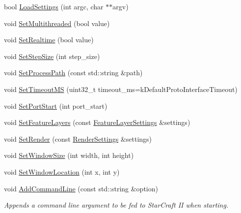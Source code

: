 \begin{DoxyCompactItemize}
\item 
bool \hyperlink{classsc2_1_1_coordinator_ada059b9a60d901be047ef33ce612c5d2}{Load\+Settings} (int argc, char $\ast$$\ast$argv)
\item 
void \hyperlink{classsc2_1_1_coordinator_a555587bc85ac437711d15b569c75181a}{Set\+Multithreaded} (bool value)
\item 
void \hyperlink{classsc2_1_1_coordinator_a602e6ead93e360771ce36d6ac782fc2a}{Set\+Realtime} (bool value)
\item 
void \hyperlink{classsc2_1_1_coordinator_a7cea718f571effbe25b771315628c685}{Set\+Step\+Size} (int step\+\_\+size)
\item 
void \hyperlink{classsc2_1_1_coordinator_ad906656238e13a8bab21c46f50aecc3d}{Set\+Process\+Path} (const std\+::string \&path)
\item 
void \hyperlink{classsc2_1_1_coordinator_aadbfd927d66314a4eb949b2de2ae37b4}{Set\+Timeout\+MS} (uint32\+\_\+t timeout\+\_\+ms=k\+Default\+Proto\+Interface\+Timeout)
\item 
void \hyperlink{classsc2_1_1_coordinator_aaad48921bac2f4f84471de5e9cff75d5}{Set\+Port\+Start} (int port\+\_\+start)
\item 
void \hyperlink{classsc2_1_1_coordinator_ab46aec5712f6ec8ef12b03854f6e0495}{Set\+Feature\+Layers} (const \hyperlink{structsc2_1_1_feature_layer_settings}{Feature\+Layer\+Settings} \&settings)
\item 
void \hyperlink{classsc2_1_1_coordinator_ace8a0630c6b61d28e81c94bbebad3d7d}{Set\+Render} (const \hyperlink{structsc2_1_1_render_settings}{Render\+Settings} \&settings)
\item 
void \hyperlink{classsc2_1_1_coordinator_a9b0eca71a6f7575f35d1dd5c3e5d73cf}{Set\+Window\+Size} (int width, int height)
\item 
void \hyperlink{classsc2_1_1_coordinator_a6e372788e11c3916fdf1982eb2e55511}{Set\+Window\+Location} (int x, int y)
\item 
\mbox{\label{classsc2_1_1_coordinator_aa59950d8ccb9d010288df3e1e6045eb9}} 
void \hyperlink{classsc2_1_1_coordinator_aa59950d8ccb9d010288df3e1e6045eb9}{Add\+Command\+Line} (const std\+::string \&option)
\begin{DoxyCompactList}\small\item\em Appends a command line argument to be fed to Star\+Craft II when starting. \end{DoxyCompactList}\item 
$$
\end{DoxyCompactItemize}
